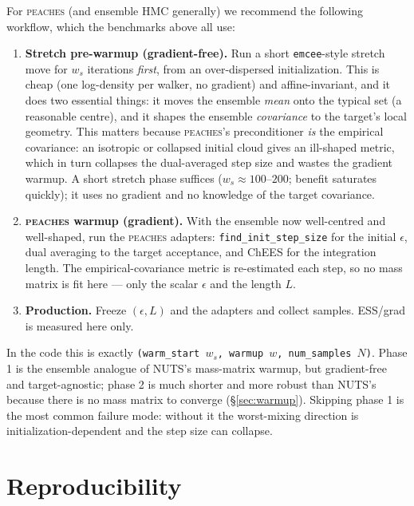 \documentclass[11pt]{article}
\begin{document}
For \textsc{peaches} (and ensemble HMC generally) we recommend the following
workflow, which the benchmarks above all use:

\begin{enumerate}
\item[\textbf{1.}] \textbf{Stretch pre-warmup (gradient-free).} Run a short
\texttt{emcee}-style stretch move for $w_s$ iterations \emph{first}, from an
over-dispersed initialization. This is cheap (one log-density per walker, no
gradient) and affine-invariant, and it does two essential things: it moves the
ensemble \emph{mean} onto the typical set (a reasonable centre), and it shapes
the ensemble \emph{covariance} to the target's local geometry. This matters
because \textsc{peaches}'s preconditioner \emph{is} the empirical covariance: an
isotropic or collapsed initial cloud gives an ill-shaped metric, which in turn
collapses the dual-averaged step size and wastes the gradient warmup. A short
stretch phase suffices ($w_s\!\approx\!100$--$200$; benefit saturates quickly);
it uses no gradient and no knowledge of the target covariance.
\item[\textbf{2.}] \textbf{\textsc{peaches} warmup (gradient).} With the
ensemble now well-centred and well-shaped, run the \textsc{peaches} adapters:
\texttt{find\_init\_step\_size} for the initial $\epsilon$, dual averaging to the
target acceptance, and ChEES for the integration length. The
empirical-covariance metric is re-estimated each step, so no mass matrix is fit
here --- only the scalar $\epsilon$ and the length $L$.
\item[\textbf{3.}] \textbf{Production.} Freeze $(\epsilon,L)$ and the adapters
and collect samples. ESS/grad is measured here only.
\end{enumerate}

In the code this is exactly \texttt{(warm\_start $w_s$, warmup $w$,
num\_samples $N$)}. Phase 1 is the ensemble analogue of NUTS's mass-matrix
warmup, but gradient-free and target-agnostic; phase 2 is much shorter and more
robust than NUTS's because there is no mass matrix to converge
(\S\ref{sec:warmup}). Skipping phase 1 is the most common failure mode: without
it the worst-mixing direction is initialization-dependent and the step size can
collapse.

\section{Reproducibility}\label{sec:repro}
\end{document}
